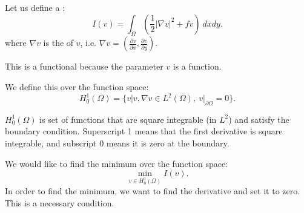 \documentclass[../main/main.tex]{subfiles}
\begin{document}
Let us define a : \[
    I(v) = \int_{\Omega} (\frac{1}{2} |\nabla v|^2 + f v)~ dxdy
.\] where $ \nabla v$ is the  of $v$, i.e.  $ \nabla v = (\frac{\partial v}{\partial x} ,\frac{\partial v}{\partial y} )$. 
\begin{remark}
    This is a functional because the parameter $v$ is a function.
\end{remark}
We define this over the function space: \[
H^1_0(\Omega) = \{v | v, \nabla v \in  L^2(\Omega),~ v\big\rvert_{\partial \Omega} = 0\} 
.\] 
\begin{remark}
    $H^1_0(\Omega)$ is set of functions that are square integrable (in $L^2$) and satisfy the boundary condition. Superscript 1 means that the first derivative is square integrable, and subscript 0 means it is zero at the boundary.
\end{remark}
We would like to find the minimum over the function space: \[
    \min_{v\in H^1_0(\Omega)} I(v)
.\] In order to find the minimum, we want to find the derivative and set it to zero. This is a necessary condition. \\
\end{document}
